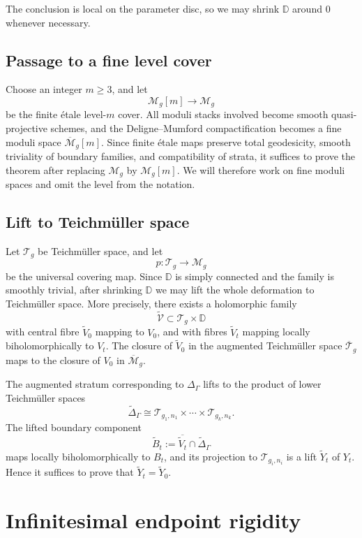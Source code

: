 \documentclass[11pt]{article}
\theoremstyle{plain}
\theoremstyle{definition}
\newcommand{\M}{\mathcal M}
\newcommand{\bM}{\overline{\M}}
\newcommand{\T}{\mathcal T}
\newcommand{\bT}{\overline{\T}}
\newcommand{\D}{\mathbb D}
\newcommand{\cV}{\mathcal V}
\begin{document}
The conclusion is local on the parameter disc, so we may shrink \(\D\) around \(0\) whenever necessary.

\subsection{Passage to a fine level cover}

Choose an integer \(m\geq 3\), and let
\[
\M_{g}[m]\longrightarrow \M_{g}
\]
be the finite \'etale level-\(m\) cover.  All moduli stacks involved become smooth quasi-projective schemes, and the Deligne--Mumford compactification becomes a fine moduli space \(\bM_{g}[m]\).  Since finite \'etale maps preserve total geodesicity, smooth triviality of boundary families, and compatibility of strata, it suffices to prove the theorem after replacing \(\M_{g}\) by \(\M_{g}[m]\).  We will therefore work on fine moduli spaces and omit the level from the notation.

\subsection{Lift to Teichm\"uller space}

Let \(\T_{g}\) be Teichm\"uller space, and let
\[
p:\T_{g}\longrightarrow \M_{g}
\]
be the universal covering map.  Since \(\D\) is simply connected and the family is smoothly trivial, after shrinking \(\D\) we may lift the whole deformation to Teichm\"uller space.  More precisely, there exists a holomorphic family
\[
\widetilde{\cV}\subset \T_{g}\times \D
\]
with central fibre \(\widetilde V_{0}\) mapping to \(V_{0}\), and with fibres \(\widetilde V_{t}\) mapping locally biholomorphically to \(V_{t}\).  The closure of \(\widetilde V_{0}\) in the augmented Teichm\"uller space \(\bT_{g}\) maps to the closure of \(V_{0}\) in \(\bM_{g}\).

The augmented stratum corresponding to \(\Delta_{\Gamma}\) lifts to the product of lower Teichm\"uller spaces
\[
\widetilde\Delta_{\Gamma}\cong \T_{g_{1},n_{1}}\times\cdots\times \T_{g_{k},n_{k}}.
\]
The lifted boundary component
\[
\widetilde B_{t}:=\overline{\widetilde V_{t}}\cap \widetilde\Delta_{\Gamma}
\]
maps locally biholomorphically to \(B_{t}\), and its projection to \(\T_{g_{i},n_{i}}\) is a lift \(\widetilde Y_{t}\) of \(Y_{t}\).  Hence it suffices to prove that \(\widetilde Y_{t}=\widetilde Y_{0}\).

\section{Infinitesimal endpoint rigidity}
\end{document}
